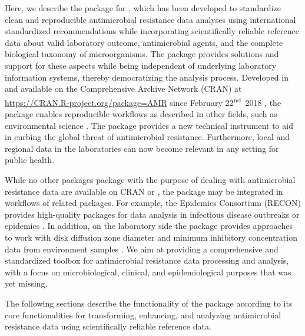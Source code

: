 \documentclass[article, shortnames]{jss}
\begin{document}
Here, we describe the  package \citep{Berends-AMRpackage} for  \citep{base_r},
which has been developed to standardize clean and reproducible antimicrobial
resistance data analyses using international standardized recommendations
\citep{Leclercq2013-ml, Clinical_and_Laboratory_Standards_Institute2014-fb}
while incorporating scientifically reliable reference data about valid
laboratory outcome, antimicrobial agents, and the complete biological
taxonomy of microorganisms.  The  package provides solutions and
support for these aspects while being independent of underlying laboratory
information systems, thereby democratizing the analysis process.  Developed
in  and available on the Comprehensive  Archive Network (CRAN)
at \url{https://CRAN.R-project.org/package=AMR}
since February 22\textsuperscript{nd}~2018 \citep{Berends-AMRpackage}, the
 package enables reproducible workflows as described in other
fields, such as environmental science \citep{Lowndes2017-hh}.  The 
package provides a new technical instrument to aid in curbing the global
threat of antimicrobial resistance.  Furthermore, local and regional data in
the laboratories can now become relevant in any setting for public health.

While no other packages  package with the purpose of dealing
with antimicrobial resistance data are available on CRAN or ,
the  package may be integrated in workflows of related packages. 
For example, the  Epidemics Consortium (RECON) provides high-quality
packages for data analysis in infectious disease outbreaks or epidemics 
\citep[for example  and ,][]{incidence,epicontacts}.
In addition, on the laboratory side the 
package provides approaches to work with disk diffusion zone diameter and
minimum inhibitory concentration data from environment samples
\citep{antibioticR}.  We aim at providing a comprehensive and standardized
toolbox for antimicrobial resistance data processing and analysis, with a
focus on microbiological, clinical, and epidemiological purposes that was
yet missing.

The following sections describe the functionality of the  package
according to its core functionalities for transforming, enhancing, and
analyzing antimicrobial resistance data using scientifically reliable
reference data.

\end{document}
